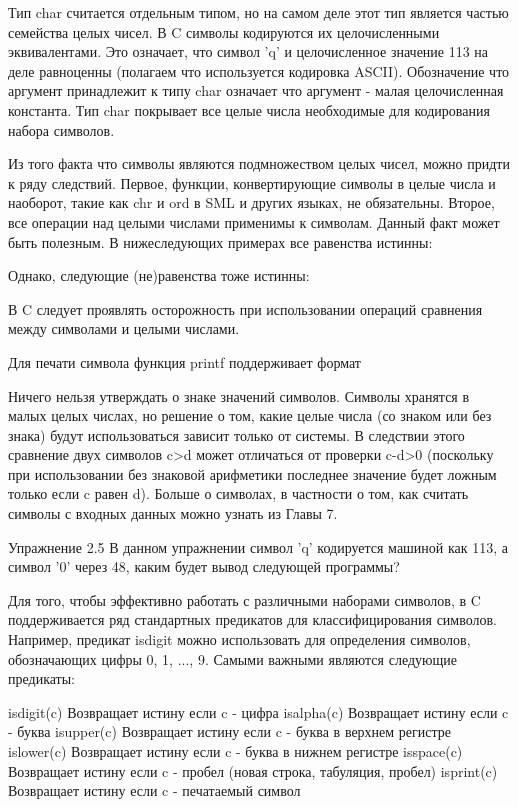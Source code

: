 Тип char считается отдельным типом, но на самом деле этот тип является частью семейства целых чисел. В C символы кодируются их целочисленными эквивалентами. Это означает, что символ 'q' и целочисленное значение 113 на деле равноценны (полагаем что используется кодировка ASCII). Обозначение что аргумент принадлежит к типу char означает что аргумент - малая целочисленная константа. Тип char покрывает все целые числа необходимые для кодирования набора символов.

Из того факта что символы являются подмножеством целых чисел, можно придти к ряду следствий. Первое, функции, конвертирующие символы в целые числа и наоборот, такие как chr и ord в SML и других языках, не обязательны. Второе, все операции над целыми числами применимы к символам. Данный факт может быть полезным. В нижеследующих примерах все равенства истинны:

Однако, следующие (не)равенства тоже истинны:

В C следует проявлять осторожность при использовании операций сравнения между символами и целыми числами.

Для печати символа функция printf поддерживает формат %

Ничего нельзя утверждать о знаке значений символов. Символы хранятся в малых целых числах, но решение о том, какие целые числа (со знаком или без знака) будут использоваться зависит только от системы. В следствии этого сравнение двух символов c>d может отличаться от проверки c-d>0 (поскольку при использовании без знаковой арифметики последнее значение будет ложным только если c равен d). Больше о символах, в частности о том, как считать символы с входных данных можно узнать из Главы 7.

Упражнение 2.5 В данном упражнении символ 'q' кодируется машиной как 113, а символ '0' через 48, каким будет вывод следующей программы?

Для того, чтобы эффективно работать с различными наборами символов, в C поддерживается ряд стандартных предикатов для классифицирования символов. Например, предикат isdigit можно использовать для определения символов, обозначающих цифры 0, 1, ..., 9. Самыми важными являются следующие предикаты:

isdigit(c) Возвращает истину если c - цифра
isalpha(c) Возвращает истину если c - буква
isupper(c) Возвращает истину если c - буква в верхнем регистре
islower(c) Возвращает истину если c - буква в нижнем регистре
isspace(c) Возвращает истину если c - пробел (новая строка, табуляция, пробел)
isprint(c) Возвращает истину если c - печатаемый символ

